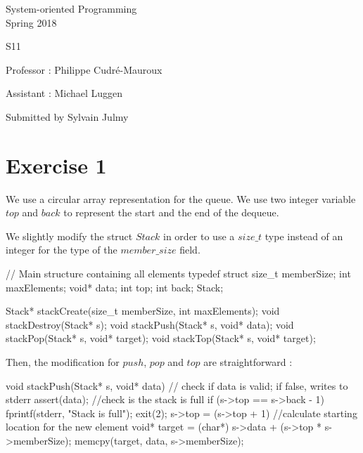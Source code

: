 \documentclass[a4paper,11pt]{report}
\author{Sylvain Julmy}
\date{\today}
\begin{document}
\begin{center}
  \Large{
    System-oriented Programming\\
    Spring 2018
  }
  
  \noindent\makebox[\linewidth]{\rule{\linewidth}{0.4pt}}
  S11
  \noindent\makebox[\linewidth]{\rule{\linewidth}{0.4pt}}

  \begin{flushleft}
    Professor : Philippe Cudré-Mauroux

    Assistant : Michael Luggen
  \end{flushleft}
  
  \noindent\makebox[\linewidth]{\rule{\linewidth}{0.4pt}}

  Submitted by Sylvain Julmy
  
  \noindent\makebox[\linewidth]{\rule{\textwidth}{1pt}}
\end{center}

\section*{Exercise 1}

We use a circular array representation for the queue. We use two integer
variable $top$ and $back$ to represent the start and the end of the dequeue.

We slightly modify the struct $Stack$ in order to use a $size\_t$ type instead
of an integer for the type of the $member\_size$ field.

\begin{ccode}
// Main structure containing all elements
typedef struct
{
    size_t memberSize;
    int maxElements;
    void* data;
    int top;
    int back;
} Stack;

Stack* stackCreate(size_t memberSize, int maxElements);
void stackDestroy(Stack* s);
void stackPush(Stack* s, void* data);
void stackPop(Stack* s, void* target);
void stackTop(Stack* s, void* target);
\end{ccode}

Then, the modification for $push$, $pop$ and $top$ are straightforward :

\begin{ccode}
void stackPush(Stack* s, void* data)
{
    // check if data is valid; if false, writes to stderr
    assert(data);
    //check is the stack is full
    if (s->top == s->back - 1)
    {
        fprintf(stderr, "Stack is full\n");
        exit(2);
    }
    s->top = (s->top + 1) %
    //calculate starting location for the new element
    void* target = (char*) s->data + (s->top * s->memberSize);
    memcpy(target, data, s->memberSize);
}
\end{ccode}
\end{document}

